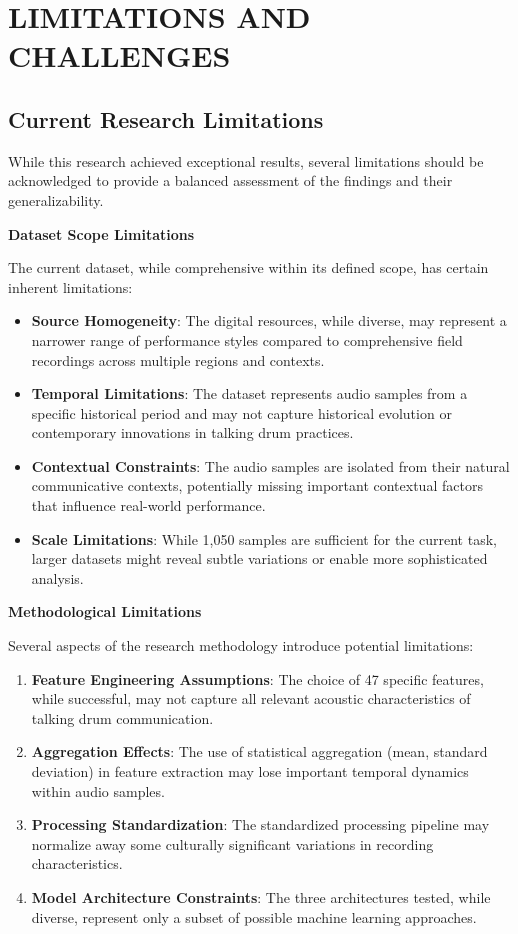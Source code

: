 \documentclass[12pt,a4paper]{article}
\begin{document}
\section{LIMITATIONS AND CHALLENGES}

\subsection{Current Research Limitations}

While this research achieved exceptional results, several limitations should be acknowledged to provide a balanced assessment of the findings and their generalizability.

\textbf{Dataset Scope Limitations}

The current dataset, while comprehensive within its defined scope, has certain inherent limitations:

\begin{itemize}
\item \textbf{Source Homogeneity}: The digital resources, while diverse, may represent a narrower range of performance styles compared to comprehensive field recordings across multiple regions and contexts.
\item \textbf{Temporal Limitations}: The dataset represents audio samples from a specific historical period and may not capture historical evolution or contemporary innovations in talking drum practices.
\item \textbf{Contextual Constraints}: The audio samples are isolated from their natural communicative contexts, potentially missing important contextual factors that influence real-world performance.
\item \textbf{Scale Limitations}: While 1,050 samples are sufficient for the current task, larger datasets might reveal subtle variations or enable more sophisticated analysis.
\end{itemize}

\textbf{Methodological Limitations}

Several aspects of the research methodology introduce potential limitations:

\begin{enumerate}
\item \textbf{Feature Engineering Assumptions}: The choice of 47 specific features, while successful, may not capture all relevant acoustic characteristics of talking drum communication.
\item \textbf{Aggregation Effects}: The use of statistical aggregation (mean, standard deviation) in feature extraction may lose important temporal dynamics within audio samples.
\item \textbf{Processing Standardization}: The standardized processing pipeline may normalize away some culturally significant variations in recording characteristics.
\item \textbf{Model Architecture Constraints}: The three architectures tested, while diverse, represent only a subset of possible machine learning approaches.
\end{enumerate}
\end{document}
